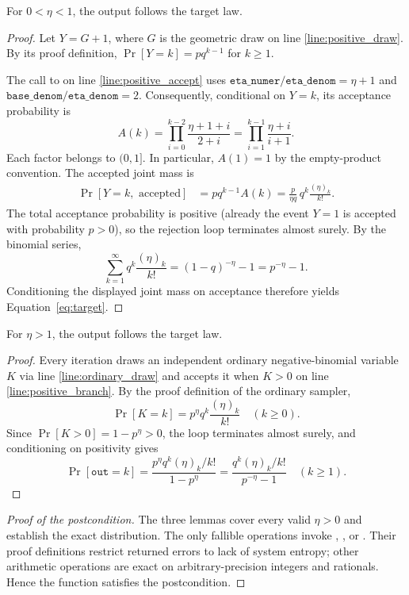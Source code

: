 \documentclass{article}
\begin{document}
\begin{lemma}
\label{lem:fractional}
For $0<\eta<1$, the output follows the target law.
\end{lemma}
\begin{proof}
Let $Y=G+1$, where $G$ is the geometric draw on line
\ref{line:positive_draw}. By its proof definition,
$\Pr[Y=k]=p q^{k-1}$ for $k\ge1$.

The call to 
on line \ref{line:positive_accept} uses
$\texttt{eta\_numer}/\texttt{eta\_denom}=\eta+1$ and
$\texttt{base\_denom}/\texttt{eta\_denom}=2$.
Consequently, conditional on $Y=k$, its acceptance probability is
\begin{equation*}
A(k)=\prod_{i=0}^{k-2}\frac{\eta+1+i}{2+i}
=\prod_{i=1}^{k-1}\frac{\eta+i}{i+1}.
\end{equation*}
Each factor belongs to $(0,1]$. In particular, $A(1)=1$ by the empty-product
convention. The accepted joint mass is
\begin{align*}
\Pr[Y=k,\text{ accepted}]
&=p q^{k-1} A(k)
=\frac{p}{\eta q}\,q^k\frac{(\eta)_k}{k!}.
\end{align*}
The total acceptance probability is positive (already the event $Y=1$
is accepted with probability $p>0$), so the rejection loop terminates
almost surely. By the binomial series,
\[
\sum_{k=1}^{\infty}q^k\frac{(\eta)_k}{k!}
=(1-q)^{-\eta}-1=p^{-\eta}-1.
\]
Conditioning the displayed joint mass on acceptance therefore yields
Equation~\ref{eq:target}.
\end{proof}

\begin{lemma}
\label{lem:integer-envelope}
For $\eta>1$, the output follows the target law.
\end{lemma}
\begin{proof}
Every iteration draws an independent ordinary negative-binomial variable
$K$ via line \ref{line:ordinary_draw} and accepts it when $K>0$ on
line \ref{line:positive_branch}.
By the proof definition of the ordinary sampler,
\[
\Pr[K=k]=p^\eta q^k\frac{(\eta)_k}{k!}
\quad(k\ge0).
\]
Since $\Pr[K>0]=1-p^\eta>0$, the loop terminates almost surely, and
conditioning on positivity gives
\[
\Pr[\texttt{out}=k]
=\frac{p^\eta q^k(\eta)_k/k!}{1-p^\eta}
=\frac{q^k(\eta)_k/k!}{p^{-\eta}-1}
\quad(k\ge1).
\]
\end{proof}

\begin{proof}[Proof of the postcondition]
The three lemmas cover every valid $\eta>0$ and establish the exact
distribution. The only fallible operations invoke
,
,
or .
Their proof definitions restrict returned errors to lack of system entropy;
other arithmetic operations are exact on arbitrary-precision integers and
rationals. Hence the function satisfies the postcondition.
\end{proof}
\end{document}
